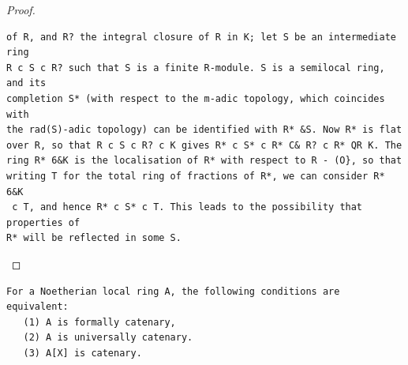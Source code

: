 \begin{proof}
\begin{verbatim}
of R, and R? the integral closure of R in K; let S be an intermediate ring
R c S c R? such that S is a finite R-module. S is a semilocal ring, and its
completion S* (with respect to the m-adic topology, which coincides with
the rad(S)-adic topology) can be identified with R* &S. Now R* is flat
over R, so that R c S c R? c K gives R* c S* c R* C& R? c R* QR K. The
ring R* 6&K is the localisation of R* with respect to R - (O}, so that
writing T for the total ring of fractions of R*, we can consider R* 6&K
 c T, and hence R* c S* c T. This leads to the possibility that properties of
R* will be reflected in some S.
\end{verbatim}
\end{proof}


\begin{theorem}\label{mcrt-auto-theorem-31-7}\uses{}
\begin{verbatim}
For a Noetherian local ring A, the following conditions are
equivalent:
   (1) A is formally catenary,
   (2) A is universally catenary.
   (3) A[X] is catenary.
\end{verbatim}
\end{theorem}
